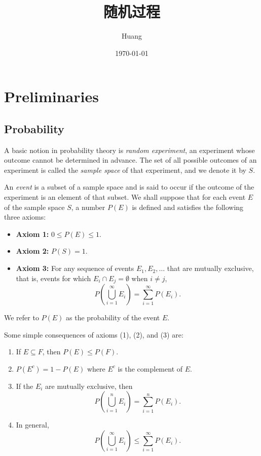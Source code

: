\documentclass[lang=cn,10pt,thmcnt=section]{elegantbook}
\title{随机过程}
\author{Huang}
\date{\today}
\begin{document}
	
	\maketitle
	\frontmatter
	
	\tableofcontents
	
	\mainmatter
	\chapter{Preliminaries}
	\section{Probability}
	A basic notion in probability theory is \textit{random experiment}, an experiment whose outcome cannot be determined in advance. The set of all possible outcomes of an experiment is called the \textit{sample space} of that experiment, and we denote it by \( S \).

An \textit{event} is a subset of a sample space and is said to occur if the outcome of the experiment is an element of that subset. We shall suppose that for each event \( E \) of the sample space \( S \), a number \( P(E) \) is defined and satisfies the following three axioms:

\begin{itemize}
    \item \textbf{Axiom 1:} \( 0 \leq P(E) \leq 1 \).
    \item \textbf{Axiom 2:} \( P(S) = 1 \).
    \item \textbf{Axiom 3:} For any sequence of events \( E_1, E_2, \dots \) that are mutually exclusive, that is, events for which \( E_i \cap E_j = \emptyset \) when \( i \neq j \), 
    \[
    P\left( \bigcup_{i=1}^{\infty} E_i \right) = \sum_{i=1}^{\infty} P(E_i).
    \]
\end{itemize}

We refer to \( P(E) \) as the probability of the event \( E \).

Some simple consequences of axioms (1), (2), and (3) are:

\begin{enumerate}
    \item If \( E \subseteq F \), then \( P(E) \leq P(F) \).
    \item \( P(E^c) = 1 - P(E) \) where \( E^c \) is the complement of \( E \).
    \item If the \( E_i \) are mutually exclusive, then
    \[
    P\left( \bigcup_{i=1}^{n} E_i \right) = \sum_{i=1}^{n} P(E_i).
    \]
    \item In general,
    \[
    P\left( \bigcup_{i=1}^{\infty} E_i \right) \leq \sum_{i=1}^{\infty} P(E_i).
    \]
\end{enumerate}
\end{document}
